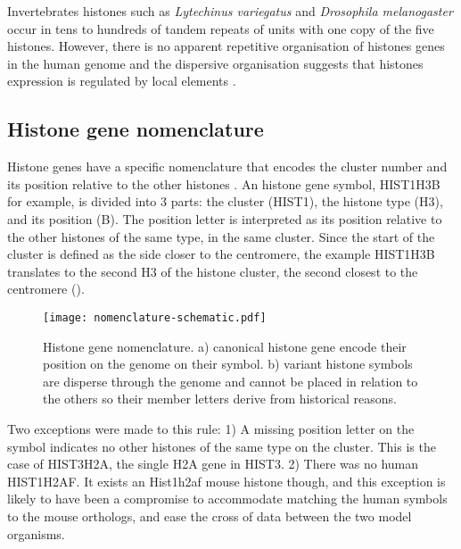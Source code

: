 
	Invertebrates histones such as \textit{Lytechinus variegatus} and \textit{Drosophila melanogaster} 
	occur in tens to hundreds of tandem repeats of units with one copy of the five histones.
	However, there is no apparent repetitive organisation of histones genes in the human genome 
	and the dispersive organisation suggests that histones expression is regulated by local elements \citep{close-regulators}.

  \subsection{Histone gene nomenclature}
    Histone genes have a specific nomenclature that encodes the cluster number and its
    position relative to the other histones \citep{Marzluff02}. An histone gene
    symbol, HIST1H3B for example, is divided into 3 parts: the cluster (HIST1),
    the histone type (H3), and its position (B). The position letter is interpreted as
    its position relative to the other histones of the same type, in the same cluster.
    Since the start of the cluster is defined as the side closer to the centromere, the
    example HIST1H3B translates to the second H3 of the histone cluster, the
    second closest to the centromere ().

    \begin{figure*}
      \centering
      \texttt{[image: nomenclature-schematic.pdf]}
      \caption{Histone gene nomenclature. a) canonical histone gene encode their position
               on the genome on their symbol. b) variant histone symbols are disperse through
               the genome and cannot be placed in relation to the others so their member
               letters derive from historical reasons.}
      \label{fig:nomenclature}
    \end{figure*}

    Two exceptions were made to this rule: 1) A missing position letter on the symbol indicates
    no other histones of the same type on the cluster. This is the case of HIST3H2A, the
    single H2A gene in HIST3. 2) There was no human HIST1H2AF. It exists an Hist1h2af mouse
    histone though, and this exception is likely to have been a compromise to accommodate
    matching the human symbols to the mouse orthologs, and ease the cross of data between the
    two model organisms.

